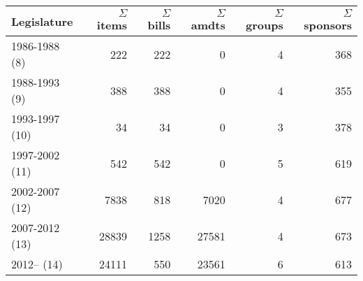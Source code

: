 \begin{tabular}{lrrrrr}
  \hline
Legislature & $\Sigma$~items & $\Sigma$~bills & $\Sigma$~amdts & $\Sigma$~groups & $\Sigma$~sponsors \\ 
  \hline
1986-1988 (8) & 222 & 222 &   0 &   4 & 368 \\ 
  1988-1993 (9) & 388 & 388 &   0 &   4 & 355 \\ 
  1993-1997 (10) &  34 &  34 &   0 &   3 & 378 \\ 
  1997-2002 (11) & 542 & 542 &   0 &   5 & 619 \\ 
  2002-2007 (12) & 7838 & 818 & 7020 &   4 & 677 \\ 
  2007-2012 (13) & 28839 & 1258 & 27581 &   4 & 673 \\ 
  2012-- (14) & 24111 & 550 & 23561 &   6 & 613 \\ 
   \hline
\end{tabular}
